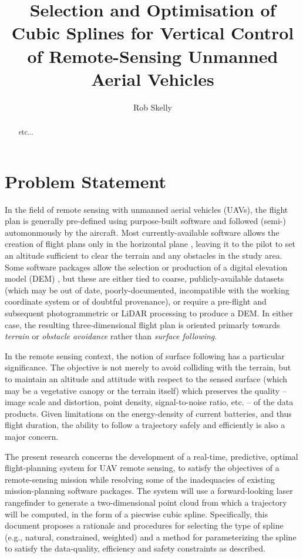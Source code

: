 \documentclass[10pt]{article}
\author{Rob Skelly}
\title{Selection and Optimisation of Cubic Splines for Vertical Control of Remote-Sensing Unmanned Aerial Vehicles}
\begin{document}
\maketitle

\begin{abstract}
etc...
\end{abstract}

\section{Problem Statement}

In the field of remote sensing with unmanned aerial vehicles (UAVs), the flight plan is generally pre-defined using purpose-built software and followed (semi-) automonmously by the aircraft. Most currently-available software allows the creation of flight plans only in the horizontal plane \cite{AruPilot2018,DJI2018a,Microdrones2018,Group2018,UAVToolbox2018}, leaving it to the pilot to set an altitude sufficient to clear the terrain and any obstacles in the study area. Some software packages allow the selection or production of a digital elevation model (DEM) \cite{PrecisionHawk2018,UgCS2018}, but these are either tied to coarse, publicly-available datasets (which may be out of date, poorly-documented, incompatible with the working coordinate system or of doubtful provenance), or require a pre-flight and subsequent photogrammetric or LiDAR processing to produce a DEM. In either case, the resulting three-dimensional flight plan is oriented primarly towards \emph{terrain} or \emph{obstacle avoidance} rather than \emph{surface following}.

In the remote sensing context, the notion of surface following has a particular significance. The objective is not merely to avoid colliding with the terrain, but to maintain an altitude and attitude with respect to the sensed surface (which may be a vegetative canopy or the terrain itself) which preserves the quality -- image scale and distortion, point density, signal-to-noise ratio, etc. -- of the data products. Given limitations on the energy-density of current batteries, and thus flight duration, the ability to follow a trajectory safely and efficiently is also a major concern.

The present research concerns the development of a real-time, predictive, optimal flight-planning system for UAV remote sensing, to satisfy the objectives of a remote-sensing mission while resolving some of the inadequacies of existing mission-planning software packages. The system will use a forward-looking laser rangefinder to generate a two-dimensional point cloud from which a trajectory will be computed, in the form of a piecwise cubic spline. Specifically, this document proposes a rationale and procedures for selecting the type of spline (e.g., natural, constrained, weighted) and a method for parameterizing the spline to satisfy the data-quality, efficiency and safety constraints as described. 
\end{document}
